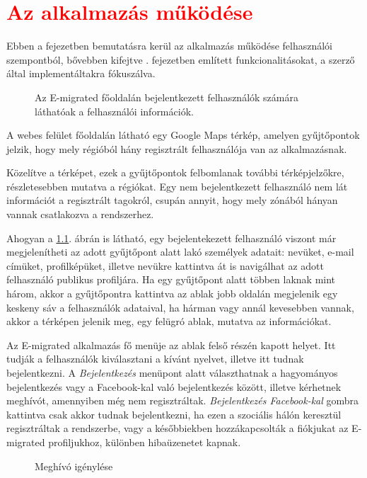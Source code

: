 \chapter{\textcolor{red}{Az alkalmazás működése}}
\label{ch:mukodes}
Ebben a fejezetben bemutatásra kerül az alkalmazás működése felhasználói szempontból, bővebben kifejtve . fejezetben említett funkcionalitásokat, a szerző által implementáltakra fókuszálva. 
\begin{figure}
  \centering
  \caption{Az E-migrated főoldalán bejelentkezett felhasználók számára láthatóak a felhasználói információk.}
  \label{fig:emigrated_terkep}
\end{figure}


A webes felület főoldalán látható egy Google Maps térkép, amelyen gyűjtőpontok jelzik, hogy mely régióból hány regisztrált felhasználója van az alkalmazásnak.

Közelítve a térképet, ezek a gyűjtőpontok felbomlanak további térképjelzőkre, részletesebben mutatva a régiókat. Egy nem bejelentkezett felhasználó nem lát információt a regisztrált tagokról, csupán annyit, hogy mely zónából hányan vannak csatlakozva a rendszerhez. 


Ahogyan a \ref{fig:emigrated_terkep}. ábrán is látható, egy bejelentekezett felhasználó viszont már megjelenítheti az adott gyűjtőpont alatt lakó személyek adatait: nevüket, e-mail címüket, profilképüket, illetve nevükre kattintva át is navigálhat az adott felhasználó publikus profiljára. Ha egy gyűjtőpont alatt többen laknak mint három, akkor a gyűjtőpontra kattintva az ablak jobb oldalán megjelenik egy keskeny sáv a felhasználók adataival, ha hárman vagy annál kevesebben vannak, akkor a térképen jelenik meg, egy felügró ablak, mutatva az információkat. 


Az E-migrated alkalmazás fő menüje az ablak felső részén kapott helyet. Itt tudják a felhasználók kiválasztani a kívánt nyelvet, illetve itt tudnak bejelentkezni. A \textit{Bejelentkezés} menüpont alatt választhatnak a hagyományos bejelentkezés vagy a Facebook-kal való bejelentkezés között, illetve kérhetnek meghívót, amennyiben még nem regisztráltak. \textit{Bejelentkezés Facebook-kal} gombra kattintva csak akkor tudnak bejelentkezni, ha ezen a szociális hálón keresztül regisztráltak a rendszerbe, vagy a későbbiekben hozzákapcsolták a fiókjukat az E-migrated profiljukhoz, különben hibaüzenetet kapnak. 
\begin{figure}
  \centering
  \caption{Meghívó igénylése}
  \label{fig:emigrated_meghivo_igenyles}
\end{figure}

